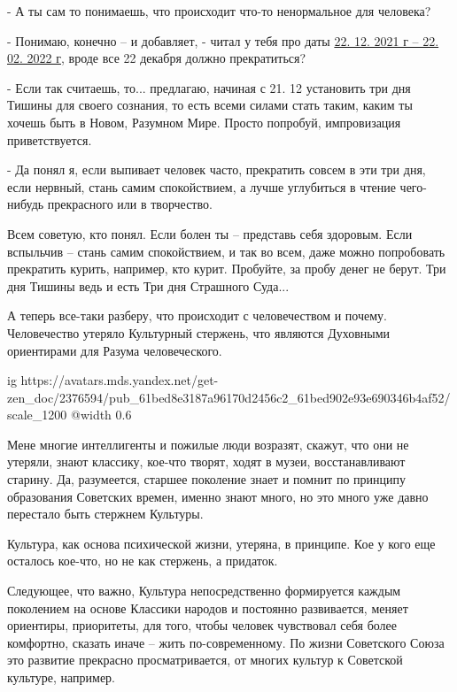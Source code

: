 - А ты сам то понимаешь, что происходит что-то ненормальное для человека?

- Понимаю, конечно – и добавляет, - читал у тебя про даты
\href{https://zen.yandex.ru/media/vestnikviktor/predskazyvaem-griaduscee--dve-daty-22-12-2021-g--22-02-2022-g-61bc22d0e93e69034678e6c6}{22. 12. 2021 г – 22. 02. 2022 г}, вроде все 22 декабря должно прекратиться?

- Если так считаешь, то... предлагаю, начиная с 21. 12 установить три дня Тишины
для своего сознания, то есть всеми силами стать таким, каким ты хочешь быть в
Новом, Разумном Мире. Просто попробуй, импровизация приветствуется.

- Да понял я, если выпивает человек часто, прекратить совсем в эти три дня,
если нервный, стань самим спокойствием, а лучше углубиться в чтение чего-нибудь
прекрасного или в творчество.

\begin{zznagolos}
Всем советую, кто понял. Если болен ты – представь себя здоровым. Если
вспыльчив – стань самим спокойствием, и так во всем, даже можно попробовать
прекратить курить, например, кто курит. Пробуйте, за пробу денег не берут. Три
дня Тишины ведь и есть Три дня Страшного Суда...	
\end{zznagolos}

А теперь все-таки разберу, что происходит с человечеством и почему.
Человечество утеряло Культурный стержень, что являются Духовными ориентирами
для Разума человеческого. 

\begin{center}
\ifcmt
  ig https://avatars.mds.yandex.net/get-zen_doc/2376594/pub_61bed8e3187a96170d2456c2_61bed902e93e690346b4af52/scale_1200
  @width 0.6
\fi

\end{center}


Мене многие интеллигенты и пожилые люди возразят, скажут, что они не утеряли,
знают классику, кое-что творят, ходят в музеи, восстанавливают старину. Да,
разумеется, старшее поколение знает и помнит по принципу образования Советских
времен, именно знают много, но это много уже давно перестало быть стержнем
Культуры.

\begin{zznagolos}
Культура, как основа психической жизни, утеряна, в принципе. Кое у кого еще
осталось кое-что, но не как стержень, а придаток.	
\end{zznagolos}

Следующее, что важно, Культура непосредственно формируется каждым поколением на
основе Классики народов и постоянно развивается, меняет ориентиры, приоритеты,
для того, чтобы человек чувствовал себя более комфортно, сказать иначе – жить
по-современному. По жизни Советского Союза это развитие прекрасно
просматривается, от многих культур к Советской культуре, например.


